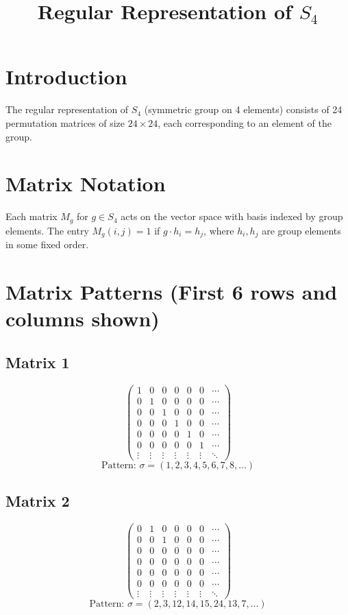 \documentclass{article}
\begin{document}
\title{Regular Representation of $S_4$}
\author{}
\date{}
\maketitle

\section*{Introduction}
The regular representation of $S_4$ (symmetric group on 4 elements) consists of 24 permutation matrices of size $24 \times 24$, each corresponding to an element of the group.

\section*{Matrix Notation}
Each matrix $M_g$ for $g \in S_4$ acts on the vector space with basis indexed by group elements. The entry $M_g(i,j) = 1$ if $g \cdot h_i = h_j$, where $h_i, h_j$ are group elements in some fixed order.

\section*{Matrix Patterns (First 6 rows and columns shown)}

\subsection*{Matrix 1}
\[
\begin{pmatrix}
  1 & 0 & 0 & 0 & 0 & 0 & \cdots \\
  0 & 1 & 0 & 0 & 0 & 0 & \cdots \\
  0 & 0 & 1 & 0 & 0 & 0 & \cdots \\
  0 & 0 & 0 & 1 & 0 & 0 & \cdots \\
  0 & 0 & 0 & 0 & 1 & 0 & \cdots \\
  0 & 0 & 0 & 0 & 0 & 1 & \cdots \\
\vdots & \vdots & \vdots & \vdots & \vdots & \vdots & \ddots
\end{pmatrix}
\]
\[
\text{Pattern: } \sigma = (1, 2, 3, 4, 5, 6, 7, 8, \ldots)
\]
\vspace{0.5em}

\subsection*{Matrix 2}
\[
\begin{pmatrix}
  0 & 1 & 0 & 0 & 0 & 0 & \cdots \\
  0 & 0 & 1 & 0 & 0 & 0 & \cdots \\
  0 & 0 & 0 & 0 & 0 & 0 & \cdots \\
  0 & 0 & 0 & 0 & 0 & 0 & \cdots \\
  0 & 0 & 0 & 0 & 0 & 0 & \cdots \\
  0 & 0 & 0 & 0 & 0 & 0 & \cdots \\
\vdots & \vdots & \vdots & \vdots & \vdots & \vdots & \ddots
\end{pmatrix}
\]
\[
\text{Pattern: } \sigma = (2, 3, 12, 14, 15, 24, 13, 7, \ldots)
\]
\vspace{0.5em}
\end{document}
